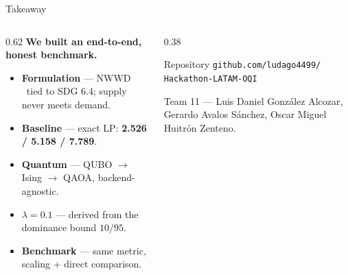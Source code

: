 \documentclass[aspectratio=169,10pt]{beamer}
\newcommand{\NWWD}{\ensuremath{\mathrm{NWWD}}}
\newcommand{\hlt}[1]{{\color{cyan}\bfseries #1}}
\begin{document}
\begin{frame}{Takeaway}
\begin{columns}[T]
\begin{column}{0.62\textwidth}
\vspace{6pt}
\Large\textbf{We built an end-to-end, honest benchmark.}\\[10pt]
\normalsize
{\footnotesize
\begin{itemize}\setlength\itemsep{4pt}
\item[\textcolor{cyan}{\textbullet}] \textbf{Formulation} — \NWWD\ tied to SDG 6.4; supply never meets demand.
\item[\textcolor{cyan}{\textbullet}] \textbf{Baseline} — exact LP: \hlt{2.526 / 5.158 / 7.789}.
\item[\textcolor{cyan}{\textbullet}] \textbf{Quantum} — QUBO $\to$ Ising $\to$ QAOA, backend-agnostic.
\item[\textcolor{cyan}{\textbullet}] \textbf{$\lambda=0.1$} — derived from the dominance bound $10/95$.
\item[\textcolor{cyan}{\textbullet}] \textbf{Benchmark} — same metric, scaling + direct comparison.
\end{itemize}}
\end{column}
\begin{column}{0.38\textwidth}
\begin{block}{Repository}
{\footnotesize \texttt{github.com/ludago4499/}\\ \texttt{Hackathon-LATAM-OQI}}
\end{block}
\vspace{4pt}
{\footnotesize\color{greytx} Team 11 — Luis Daniel González Alcozar, Gerardo Avalos Sánchez, Oscar Miguel Huitrón Zenteno.}\\[8pt]
\end{column}
\end{columns}
\end{frame}
\end{document}
